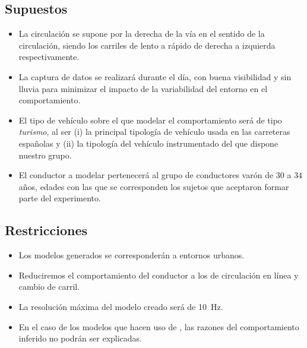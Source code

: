 \subsection{Supuestos}

\begin{itemize}
	\item La circulación se supone por la derecha de la vía en el sentido de la circulación, siendo los carriles de lento a rápido de derecha a izquierda respectivamente.
	\item La captura de datos se realizará durante el día, con buena visibilidad y sin lluvia para minimizar el impacto de la variabilidad del entorno en el comportamiento.
	\item El tipo de vehículo sobre el que modelar el comportamiento será de tipo \textit{turismo}, al ser (i) la principal tipología de vehículo usada en las carreteras españolas y (ii) la tipología del vehículo instrumentado del que dispone nuestro grupo.
	\item El conductor a modelar pertenecerá al grupo de conductores varón de $30$ a $34$ años, edades con las que se corresponden los sujetos que aceptaron formar parte del experimento.
\end{itemize}

\subsection{Restricciones}

\begin{itemize}
	\item Los modelos generados se corresponderán a entornos urbanos.
	\item Reduciremos el comportamiento del conductor a los de circulación en línea y cambio de carril.
	\item La resolución máxima del modelo creado será de \SI{10}{\hertz}.
	\item En el caso de los modelos que hacen uso de , las razones del comportamiento inferido no podrán ser explicadas.
\end{itemize}

